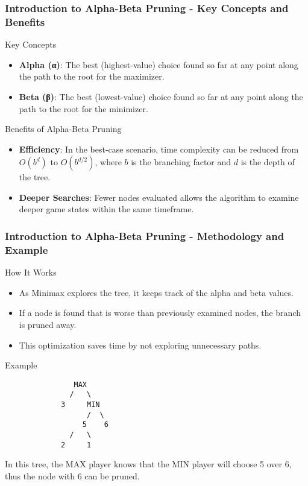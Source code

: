 \documentclass[aspectratio=169]{beamer}
\begin{document}
\begin{frame}[fragile]
    \frametitle{Introduction to Alpha-Beta Pruning - Key Concepts and Benefits}
    \begin{block}{Key Concepts}
        \begin{itemize}
            \item \textbf{Alpha (α)}: The best (highest-value) choice found so far at any point along the path to the root for the maximizer.
            \item \textbf{Beta (β)}: The best (lowest-value) choice found so far at any point along the path to the root for the minimizer.
        \end{itemize}
    \end{block}
    
    \begin{block}{Benefits of Alpha-Beta Pruning}
        \begin{itemize}
            \item \textbf{Efficiency}: In the best-case scenario, time complexity can be reduced from $O(b^d)$ to $O(b^{d/2})$, where $b$ is the branching factor and $d$ is the depth of the tree.
            \item \textbf{Deeper Searches}: Fewer nodes evaluated allows the algorithm to examine deeper game states within the same timeframe.
        \end{itemize}
    \end{block}
\end{frame}

\begin{frame}[fragile]
    \frametitle{Introduction to Alpha-Beta Pruning - Methodology and Example}
    \begin{block}{How It Works}
        \begin{itemize}
            \item As Minimax explores the tree, it keeps track of the alpha and beta values.
            \item If a node is found that is worse than previously examined nodes, the branch is pruned away. 
            \item This optimization saves time by not exploring unnecessary paths.
        \end{itemize}
    \end{block}
    
    \begin{block}{Example}
        \begin{verbatim}
                MAX
               /   \
             3     MIN
                   /  \
                  5    6
               /   \
             2     1
        \end{verbatim}
        In this tree, the MAX player knows that the MIN player will choose 5 over 6, thus the node with 6 can be pruned.
    \end{block}
\end{frame}
\end{document}
